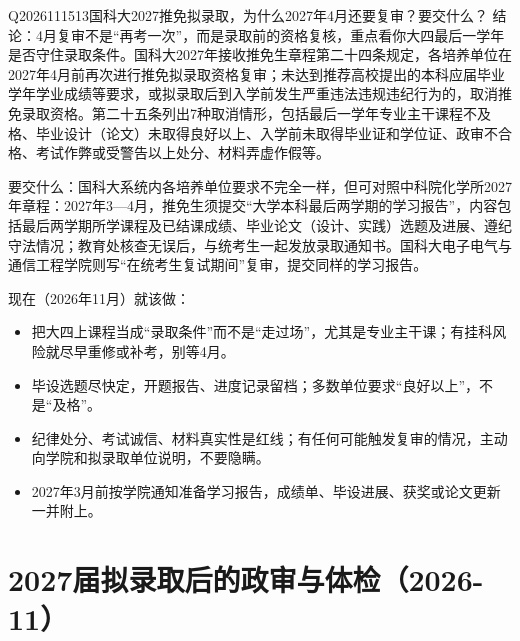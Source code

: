 \begin{qa}{Q2026111513}{国科大2027推免拟录取，为什么2027年4月还要复审？要交什么？}
结论：4月复审不是“再考一次”，而是录取前的资格复核，重点看你大四最后一学年是否守住录取条件。国科大2027年接收推免生章程第二十四条规定，各培养单位在2027年4月前再次进行推免拟录取资格复审；未达到推荐高校提出的本科应届毕业学年学业成绩等要求，或拟录取后到入学前发生严重违法违规违纪行为的，取消推免录取资格。第二十五条列出7种取消情形，包括最后一学年专业主干课程不及格、毕业设计（论文）未取得良好以上、入学前未取得毕业证和学位证、政审不合格、考试作弊或受警告以上处分、材料弄虚作假等。

要交什么：国科大系统内各培养单位要求不完全一样，但可对照中科院化学所2027年章程：2027年3—4月，推免生须提交“大学本科最后两学期的学习报告”，内容包括最后两学期所学课程及已结课成绩、毕业论文（设计、实践）选题及进展、遵纪守法情况；教育处核查无误后，与统考生一起发放录取通知书。国科大电子电气与通信工程学院则写“在统考生复试期间”复审，提交同样的学习报告。

现在（2026年11月）就该做：

\begin{itemize}
\item 把大四上课程当成“录取条件”而不是“走过场”，尤其是专业主干课；有挂科风险就尽早重修或补考，别等4月。
\item 毕设选题尽快定，开题报告、进度记录留档；多数单位要求“良好以上”，不是“及格”。
\item 纪律处分、考试诚信、材料真实性是红线；有任何可能触发复审的情况，主动向学院和拟录取单位说明，不要隐瞒。
\item 2027年3月前按学院通知准备学习报告，成绩单、毕设进展、获奖或论文更新一并附上。
\end{itemize}
\end{qa}
\section{2027届拟录取后的政审与体检（2026-11）}

